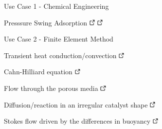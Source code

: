 \documentclass[compress,newPxFont,sthlmFooter]{beamer}
\begin{document}
\begin{frame}[plain]{Use Case 1 - Chemical Engineering}
\begin{itemize}
{          \item \alert{Presssure Swing Adsorption}
                \href{http://doi.org/10.1021/ie801357a}{\includegraphics[align=b, height=0.8em]{link.png}} 
                \href{http://doi.org/10.1021/ie0712582}{\includegraphics[align=b, height=0.8em]{link.png}}
       }
    \end{itemize}
\end{frame}

\begin{frame}[plain]{Use Case 2 - Finite Element Method}
    \begin{itemize}
      {\small
          \item \alert{Transient heat conduction/convection}
                \href{http://daetools.com/docs/tutorials-fe.html\#tutorial-dealii-2}{\includegraphics[align=b, height=0.8em]{link.png}}
          \item \alert{Cahn-Hilliard equation}
                \href{http://daetools.com/docs/tutorials-fe.html\#tutorial-dealii-3}{\includegraphics[align=b, height=0.8em]{link.png}}
          \item \alert{Flow through the porous media}
                \href{http://daetools.com/docs/tutorials-fe.html\#tutorial-dealii-5}{\includegraphics[align=b, height=0.8em]{link.png}}
          \item \alert{Diffusion/reaction in an irregular catalyst shape}
                \href{http://daetools.com/docs/tutorials-fe.html\#tutorial-dealii-6}{\includegraphics[align=b, height=0.8em]{link.png}}
          \item \alert{Stokes flow driven by the differences in buoyancy}
                \href{http://daetools.com/docs/tutorials-fe.html\#tutorial-dealii-7}{\includegraphics[align=b, height=0.8em]{link.png}}
}
\end{itemize}
\end{frame}
\end{document}
